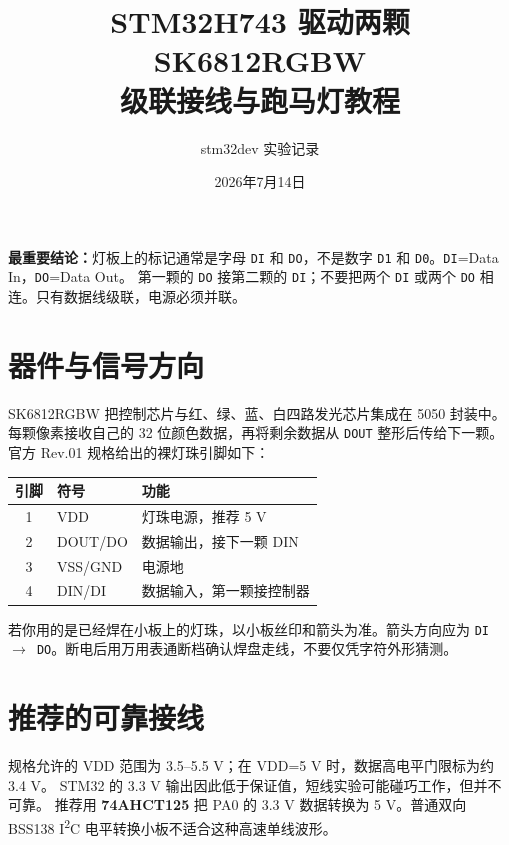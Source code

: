 \documentclass[UTF8,11pt]{ctexart}
\title{STM32H743 驱动两颗 SK6812RGBW\\级联接线与跑马灯教程}
\author{stm32dev 实验记录}
\date{2026年7月14日}
\begin{document}
\maketitle

\begin{center}
\colorbox{warm}{\parbox{0.91\textwidth}{
\textbf{最重要结论：}灯板上的标记通常是字母 \texttt{DI} 和 \texttt{DO}，不是数字
\texttt{D1} 和 \texttt{D0}。\texttt{DI}=Data In，\texttt{DO}=Data Out。
第一颗的 \texttt{DO} 接第二颗的 \texttt{DI}；不要把两个 \texttt{DI} 或两个
\texttt{DO} 相连。只有数据线级联，电源必须并联。
}}
\end{center}

\section{器件与信号方向}

SK6812RGBW 把控制芯片与红、绿、蓝、白四路发光芯片集成在 5050 封装中。
每颗像素接收自己的 32 位颜色数据，再将剩余数据从 \texttt{DOUT} 整形后传给下一颗。
官方 Rev.01 规格给出的裸灯珠引脚如下：

\begin{center}
\begin{tabular}{cll}
\toprule
引脚 & 符号 & 功能 \\
\midrule
1 & VDD & 灯珠电源，推荐 5 V \\
2 & DOUT/DO & 数据输出，接下一颗 DIN \\
3 & VSS/GND & 电源地 \\
4 & DIN/DI & 数据输入，第一颗接控制器 \\
\bottomrule
\end{tabular}
\end{center}

若你用的是已经焊在小板上的灯珠，以小板丝印和箭头为准。箭头方向应为
\texttt{DI $\rightarrow$ DO}。断电后用万用表通断档确认焊盘走线，不要仅凭字符外形猜测。

\section{推荐的可靠接线}

规格允许的 VDD 范围为 3.5--5.5 V；在 VDD=5 V 时，数据高电平门限标为约 3.4 V。
STM32 的 3.3 V 输出因此低于保证值，短线实验可能碰巧工作，但并不可靠。
推荐用 \textbf{74AHCT125} 把 PA0 的 3.3 V 数据转换为 5 V。普通双向 BSS138
I\textsuperscript{2}C 电平转换小板不适合这种高速单线波形。
\end{document}
